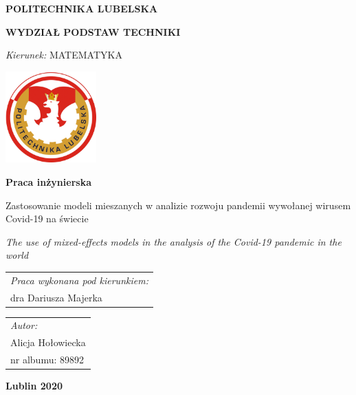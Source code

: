 \documentclass[12pt]{mwbk}
\theoremstyle{plain}
\theoremstyle{definition}
\theoremstyle{remark}
\begin{document}

\thispagestyle{empty}  %


\newcommand\tytul{Zastosowanie modeli mieszanych w analizie rozwoju pandemii wywołanej wirusem Covid-19 na świecie}

\newcommand\tytulangielski{The use of mixed-effects models in the analysis of the Covid-19 pandemic in the world}


\begin{center}


{\large \bf POLITECHNIKA LUBELSKA}

{\bf WYDZIAŁ PODSTAW TECHNIKI}

\emph{Kierunek:} MATEMATYKA


\vfill %
     

\includegraphics[width=3.5cm]{rys/logopl}

\vfill

\textbf{Praca inżynierska}

\vfill
\vfill
\vfill

\large
\tytul

\vfill

\emph{\tytulangielski}


\vfill
\vfill
\vfill
\vfill
\vfill

\begin{tabular}[t]{l}
\emph{Praca wykonana pod kierunkiem:}
\\
dra Dariusza Majerka
\end{tabular}
\hfill
\begin{tabular}[t]{l}
	\emph{Autor:}
\\
Alicja Hołowiecka\\
nr albumu: 89892 
\end{tabular}

\vfill
\vfill
\vfill

\textbf{Lublin 2020}

\end{center}
\end{document}
